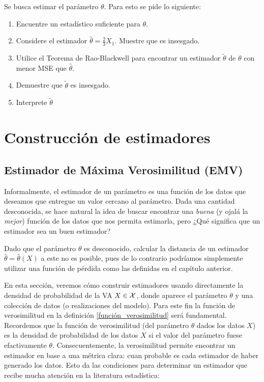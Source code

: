 \begin{enumerate}
Se busca estimar el parámetro $\theta$. Para esto se pide lo siguiente:
\begin{enumerate}
    \item Encuentre un estadístico suficiente para $\theta$.
    \item Considere el estimador $\hat{\theta}=\frac{2}{3}X_1$. Muestre que es insesgado.
    \item Utilice el Teorema de Rao-Blackwell para encontrar un estimador $\widetilde{\theta}$ de $\theta$ con menor MSE que $\hat{\theta}$. 
    \item Demuestre que $\widetilde{\theta}$ es insesgado.
    \item Interprete $\widetilde{\theta}$
\end{enumerate}
\end{enumerate}



\chapter{Construcción de estimadores}

\section{Estimador de Máxima Verosimilitud (EMV)} %
\label{sec:estimador_de_máxima_verosimilitud}

Informalmente, el estimador de un parámetro es una función de los datos que deseamos que entregue un valor cercano al parámetro. Dada una cantidad desconocida, se hace natural la idea de buscar encontrar una \emph{buena} (y ojalá la \emph{mejor}) función de los datos que nos permita estimarla, pero ¿Qué significa que un estimador sea un buen estimador?

Dado que el parámetro $\theta$ es desconocido, calcular la distancia de un estimador $\hat\theta = \hat\theta(X)$ a este no es posible, pues de lo contrario  podríamos simplemente utilizar una función de pérdida como las definidas en el capítulo anterior.

En esta sección, veremos cómo construir estimadores usando directamente la densidad de probabilidad de la VA $X\in{\mathcal X}$, donde aparece el parámetro $\theta$ y una colección de datos (o realizaciones del modelo). Para este fin la función de verosimilitud en la definición \ref{función_verosimilitud} será fundamental. Recordemos que la función de verosimilitud (del parámetro $\theta$ dados los datos $X$) es la densidad de probabilidad de los datos $X$ si el valor del parámetro fuese efactivamente $\theta$. Consecuentemente, la verosimilitud permite encontrar un estimador en base a una métrica clara: cuan probable es cada estimador de haber generado los datos. Esto da las condiciones para determinar un estimador que recibe mucha atención en la literatura estadística: 

